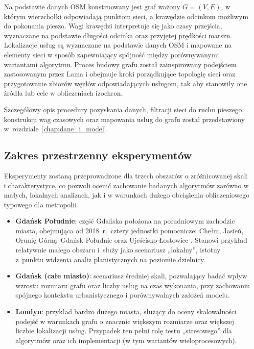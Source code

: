 Na podstawie danych OSM konstruowany jest graf ważony $G=(V,E)$, w którym wierzchołki odpowiadają
punktom sieci, a krawędzie odcinkom możliwym do pokonania pieszo.
Wagi krawędzi interpretuje się jako czasy przejścia, wyznaczane na podstawie długości odcinka
oraz przyjętej prędkości marszu. Lokalizacje usług są wyznaczane na podstawie danych OSM
i mapowane na elementy sieci w sposób zapewniający spójność między porównywanymi wariantami
algorytmu. Proces budowy grafu został zainspirowany podejściem zastosowanym przez Lama
\cite{Lam2024} i obejmuje kroki porządkujące topologię sieci oraz przygotowanie zbiorów węzłów
odpowiadających usługom, tak aby stanowiły one źródła lub cele w obliczeniach izochron.

Szczegółowy opis procedury pozyskania danych, filtracji sieci do ruchu pieszego, konstrukcji
wag czasowych oraz mapowania usług do grafu został przedstawiony w~rozdziale~\ref{chap:dane_i_model}.

\clearpage

\subsection{Zakres przestrzenny eksperymentów}
\label{sec:intro:metodyka:obszary}

Eksperymenty zostaną przeprowadzone dla trzech obszarów o zróżnicowanej skali i charakterystyce,
co pozwoli ocenić zachowanie badanych algorytmów zarówno w małych, lokalnych analizach,
jak i w warunkach dużego obciążenia obliczeniowego typowego dla metropolii.

\begin{itemize}
  \item \textbf{Gdańsk Południe}: część Gdańska położona na południowym zachodzie miasta,
        obejmująca od 2018~r.\ cztery jednostki pomocnicze: Chełm, Jasień, Orunię
        Górną--Gdańsk Południe oraz Ujeścisko-Łostowice \cite{wiki:gdansk_poludnie}.
        Stanowi przykład relatywnie małego obszaru i~służy jako scenariusz „lokalny”,
        istotny z~punktu widzenia analiz planistycznych na poziomie dzielnicy.

  \item \textbf{Gdańsk (całe miasto)}: scenariusz średniej skali, pozwalający badać wpływ
        wzrostu rozmiaru grafu oraz liczby usług na czas wykonania, przy zachowaniu spójnego
        kontekstu urbanistycznego i porównywalnych założeń modelu.

  \item \textbf{Londyn}: przykład bardzo dużego miasta, służący do oceny skalowalności podejść
        w warunkach grafu o znacznie większym rozmiarze oraz większej liczbie lokalizacji usług.
        Przypadek ten pełni rolę testu „stresowego” dla algorytmów oraz ich implementacji
        (w tym wariantów wieloprocesowych).
\end{itemize}

